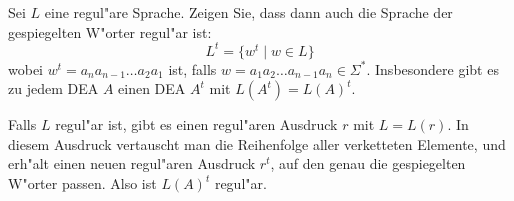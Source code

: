 Sei $L$ eine regul"are Sprache. Zeigen Sie, dass dann auch die Sprache
der gespiegelten W"orter regul"ar ist:
\[
L^t
=
\{
w^t\;|\;w\in L
\}
\]
wobei $w^t=a_na_{n-1}\dots a_2a_1$ ist, falls
$w=a_1a_2\dots a_{n-1}a_n\in\Sigma^*$. Insbesondere gibt es zu jedem DEA $A$
einen DEA $A^t$ mit $L(A^t)=L(A)^t$.

\begin{loesung}
Falls $L$ regul"ar ist, gibt es einen regul"aren Ausdruck $r$
mit $L=L(r)$. In diesem Ausdruck vertauscht man die Reihenfolge aller
verketteten Elemente, und erh"alt einen neuen regul"aren Ausdruck
$r^t$, auf den genau die gespiegelten W"orter passen.
Also ist $L(A)^t$ regul"ar.
\end{loesung}
